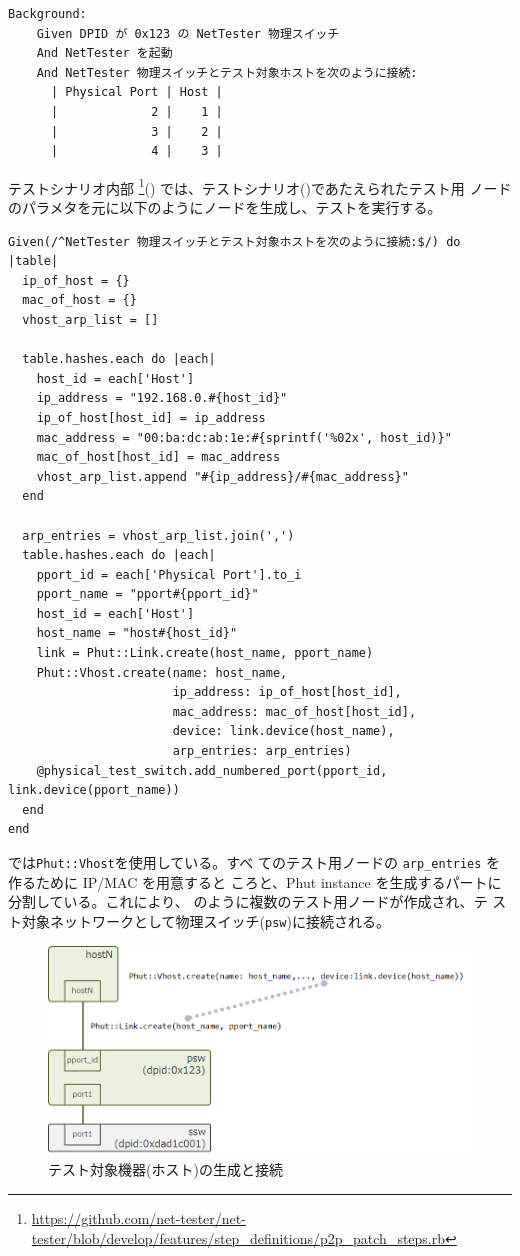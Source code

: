 \begin{lstlisting}[caption=テスト用ノードの生成,label=lst:create-testnode]
  Background:
    Given DPID が 0x123 の NetTester 物理スイッチ
    And NetTester を起動
    And NetTester 物理スイッチとテスト対象ホストを次のように接続:
      | Physical Port | Host |
      |             2 |    1 |
      |             3 |    2 |
      |             4 |    3 |
\end{lstlisting}

テストシナリオ内部
\footnote{\url{https://github.com/net-tester/net-tester/blob/develop/features/step_definitions/p2p_patch_steps.rb}}()
では、テストシナリオ()であたえられたテスト用
ノードのパラメタを元に以下のようにノードを生成し、テストを実行する。

\begin{lstlisting}[caption=テスト用ノードの生成と操作,label=lst:operate-testnode]
Given(/^NetTester 物理スイッチとテスト対象ホストを次のように接続:$/) do |table|
  ip_of_host = {}
  mac_of_host = {}
  vhost_arp_list = []

  table.hashes.each do |each|
    host_id = each['Host']
    ip_address = "192.168.0.#{host_id}"
    ip_of_host[host_id] = ip_address
    mac_address = "00:ba:dc:ab:1e:#{sprintf('%02x', host_id)}"
    mac_of_host[host_id] = mac_address
    vhost_arp_list.append "#{ip_address}/#{mac_address}"
  end

  arp_entries = vhost_arp_list.join(',')
  table.hashes.each do |each|
    pport_id = each['Physical Port'].to_i
    pport_name = "pport#{pport_id}"
    host_id = each['Host']
    host_name = "host#{host_id}"
    link = Phut::Link.create(host_name, pport_name)
    Phut::Vhost.create(name: host_name,
                       ip_address: ip_of_host[host_id],
                       mac_address: mac_of_host[host_id],
                       device: link.device(host_name),
                       arp_entries: arp_entries)
    @physical_test_switch.add_numbered_port(pport_id, link.device(pport_name))
  end
end
\end{lstlisting}

では\verb|Phut::Vhost|を使用している。すべ
てのテスト用ノードの \verb|arp_entries| を作るために IP/MAC を用意すると
ころと、Phut instance を生成するパートに分割している。これにより、
のように複数のテスト用ノードが作成され、テ
スト対象ネットワークとして物理スイッチ(\verb|psw|)に接続される。

\begin{figure}[h]
 \centering
 \includegraphics[scale=0.6]{img/phut-testee-host.png}
 \caption{テスト対象機器(ホスト)の生成と接続}
 \label{fig:phut-testee-host}
\end{figure}

